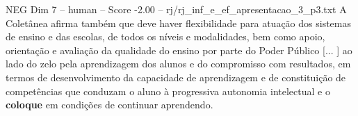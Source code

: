 \begin{textsample}{NEG Dim 7 – human – Score -2.00 – rj/rj\_inf\_e\_ef\_apresentacao\_3\_p3.txt}  \label{ex:f7_neg_015}
A Coletânea afirma também que deve haver flexibilidade para atuação dos sistemas de ensino e das escolas, de todos os níveis e modalidades, bem como apoio, orientação e avaliação da qualidade do ensino por parte do Poder Público [... ] ao lado do zelo pela aprendizagem dos alunos e do compromisso com resultados, em termos de desenvolvimento da capacidade de aprendizagem e de constituição de competências que conduzam o aluno à progressiva autonomia intelectual e o \textbf{coloque} em condições de continuar aprendendo.

\end{textsample}
